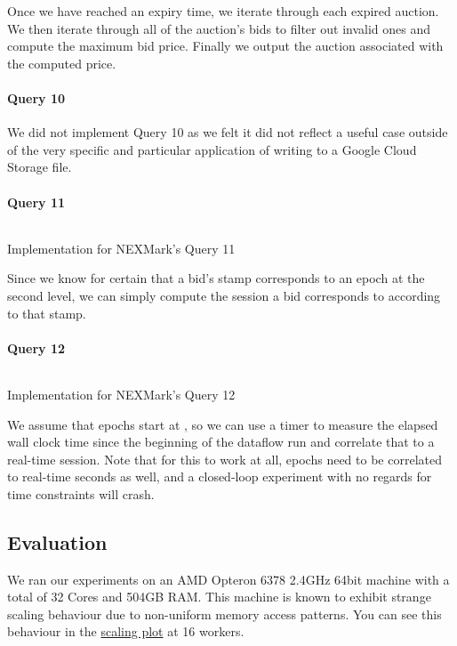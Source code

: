 Once we have reached an expiry time, we iterate through each expired auction. We then iterate through all of the auction's bids to filter out invalid ones and compute the maximum bid price. Finally we output the auction associated with the computed price.

\paragraph{Query 10}
We did not implement Query 10 as we felt it did not reflect a useful case outside of the very specific and particular application of writing to a Google Cloud Storage file.

\paragraph{Query 11}
\begin{listing}[H]
  \inputminted[firstline=833,lastline=836]{rust}{benchmarks/src/nexmark.rs}
  \caption{Implementation for NEXMark's Query 11}
  \label{lst:nexmark-query11}
\end{listing}

Since we know for certain that a bid's  stamp corresponds to an epoch at the second level, we can simply compute the session a bid corresponds to according to that stamp.

\paragraph{Query 12}
\begin{listing}[H]
  \inputminted[firstline=860,lastline=866]{rust}{benchmarks/src/nexmark.rs}
  \caption{Implementation for NEXMark's Query 12}
  \label{lst:nexmark-query12}
\end{listing}

We assume that epochs start at , so we can use a timer to measure the elapsed wall clock time since the beginning of the dataflow run and correlate that to a real-time session. Note that for this to work at all, epochs need to be correlated to real-time seconds as well, and a closed-loop experiment with no regards for time constraints will crash.

\subsection{Evaluation}
We ran our experiments on an AMD Opteron 6378 2.4GHz 64bit machine with a total of 32 Cores and 504GB RAM. This machine is known to exhibit strange scaling behaviour due to non-uniform memory access patterns. You can see this behaviour in the \hyperref[figure:ysb-scaling]{scaling plot} at 16 workers. \\

